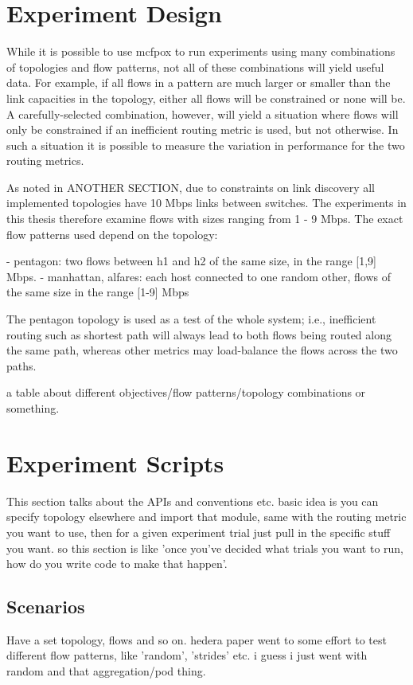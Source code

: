 \section{Experiment Design}
While it is possible to use mcfpox to run experiments using many combinations of topologies and flow patterns, not all of these combinations will yield useful data. For example, if all flows in a pattern are much larger or smaller than the link capacities in the topology, either all flows will be constrained or none will be. A carefully-selected combination, however, will yield a situation where flows will only be constrained if an inefficient routing metric is used, but not otherwise. In such a situation it is possible to measure the variation in performance for the two routing metrics.

As noted in ANOTHER SECTION, due to constraints on link discovery all implemented topologies have 10 Mbps links between switches. The experiments in this thesis therefore examine flows with sizes ranging from 1 - 9 Mbps. The exact flow patterns used depend on the topology:

- pentagon: two flows between h1 and h2 of the same size, in the range [1,9] Mbps.
- manhattan, alfares: each host connected to one random other, flows of the same size in the range [1-9] Mbps

The pentagon topology is used as a test of the whole system; i.e., inefficient routing such as shortest path will always lead to both flows being routed along the same path, whereas other metrics may load-balance the flows across the two paths.

a table about different objectives/flow patterns/topology combinations or something.

\section{Experiment Scripts}
This section talks about the APIs and conventions etc. basic idea is you can specify topology elsewhere and import that module, same with the routing metric you want to use, then for a given experiment trial just pull in the specific stuff you want. so this section is like 'once you've decided what trials you want to run, how do you write code to make that happen'.

\subsection{Scenarios}
Have a set topology, flows and so on. hedera paper went to some effort to test different flow patterns, like 'random', 'strides' etc. i guess i just went with random and that aggregation/pod thing. 

